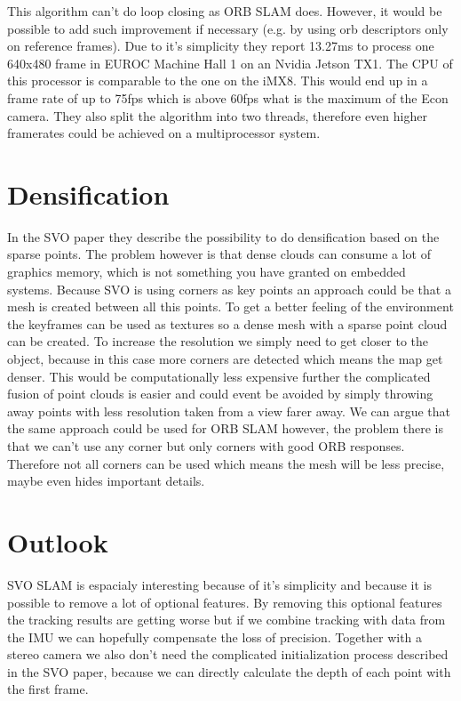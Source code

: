 \documentclass[11pt,a4paper,titlepage,oneside]{report}
\begin{document}
This algorithm can't do loop closing as ORB SLAM does. However, it would be possible to add such improvement if necessary (e.g. by using orb descriptors only on reference frames). Due to it's simplicity they report 13.27ms to process one 640x480 frame in EUROC Machine Hall 1 on an Nvidia Jetson TX1. The CPU of this processor is comparable to the one on the iMX8. This would end up in a frame rate of up to 75fps which is above 60fps what is the maximum of the Econ camera. They also split the algorithm into two threads, therefore even higher framerates could be achieved on a multiprocessor system.

\section{Densification}

In the SVO paper they describe the possibility to do densification based on the sparse points. The problem however is that dense clouds can consume a lot of graphics memory, which is not something you have granted on embedded systems. Because SVO is using corners as key points an approach could be that a mesh is created between all this points. To get a better feeling of the environment the keyframes can be used as textures so a dense mesh with a sparse point cloud can be created. To increase the resolution we simply need to get closer to the object, because in this case more corners are detected which means the map get denser. This would be computationally less expensive further the complicated fusion of point clouds is easier and could event be avoided by simply throwing away points with less resolution taken from a view farer away. We can argue that the same approach could be used for ORB SLAM however, the problem there is that we can't use any corner but only corners with good ORB responses. Therefore not all corners can be used which means the mesh will be less precise, maybe even hides important details.

\section{Outlook}
SVO SLAM is espacialy interesting because of it's simplicity and because it is possible to remove a lot of optional features. By removing this optional features the tracking results are getting worse but if we combine tracking with data from the IMU we can hopefully compensate the loss of precision. Together with a stereo camera we also don't need the complicated initialization process described in the SVO paper, because we can directly calculate the depth of each point with the first frame.
\end{document}
